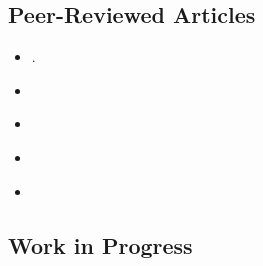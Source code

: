 \subsection*{Peer-Reviewed Articles}


\begin{itemize}

	\item[\textcolor{gray}{\textbullet}] \href{https://link.springer.com/article/10.1057/s41269-020-00174-4}{}.

	\item[\textcolor{gray}{\textbullet}] \href{https://doi.org/10.1016/j.ejpoleco.2021.102048}{}

	\item[\textcolor{gray}{\textbullet}] \href{https://doi.org/10.1111/rsp3.12337}{}

	\item[\textcolor{gray}{\textbullet}] \href{https://journals.sub.uni-hamburg.de/giga/jpla/article/view/1121/1128}{}

	\item[\textcolor{gray}{\textbullet}] \href{https://scielo.conicyt.cl/pdf/revcipol/v31n2/art07.pdf}{}
  
\end{itemize}







\subsection*{Work in Progress}



